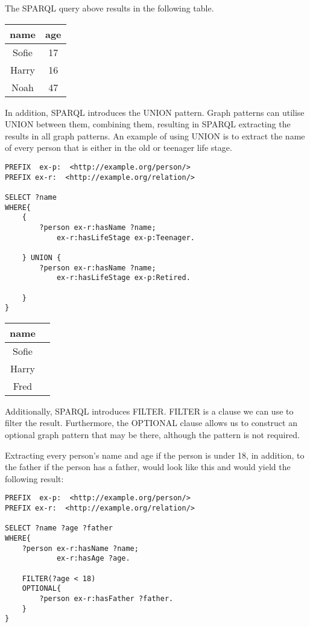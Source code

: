 \para
The SPARQL query above results in the following table. 

\para
\begin{tabular}{@{}cc@{}}
    \toprule
    name & age  \\ \midrule
    Sofie & 17 \\ 
    Harry & 16 \\ 
    Noah  & 47 \\ \bottomrule
\end{tabular}

\para 
In addition, SPARQL introduces the UNION pattern. Graph patterns can utilise UNION between them, combining them, resulting in SPARQL extracting the results in all graph patterns. An example of using UNION is to extract the name of every person that is either in the old or teenager life stage.

\para
\begin{lstlisting}[frame=single, language=turtle, frame=none]
PREFIX  ex-p:  <http://example.org/person/> 
PREFIX ex-r:  <http://example.org/relation/> 

SELECT ?name
WHERE{
    {
        ?person ex-r:hasName ?name;
            ex-r:hasLifeStage ex-p:Teenager.

    } UNION {
        ?person ex-r:hasName ?name;
            ex-r:hasLifeStage ex-p:Retired.

    }
}
\end{lstlisting}

\para
\begin{tabular}{@{}cc@{}}
    \toprule
    name & \\ \midrule
    Sofie \\ 
    Harry \\ 
    Fred  \\ \bottomrule
\end{tabular}


\para
Additionally, SPARQL introduces FILTER. FILTER is a clause we can use to filter the result. Furthermore, the OPTIONAL clause allows us to construct an optional graph pattern that may be there, although the pattern is not required.

\para
Extracting every person's name and age if the person is under 18, in addition, to the father if the person has a father, would look like this and would yield   the following result:

\para
\begin{lstlisting}[frame=single, language=turtle, frame=none]
PREFIX  ex-p:  <http://example.org/person/> 
PREFIX ex-r:  <http://example.org/relation/> 

SELECT ?name ?age ?father
WHERE{
    ?person ex-r:hasName ?name;
            ex-r:hasAge ?age.

    FILTER(?age < 18)
    OPTIONAL{
        ?person ex-r:hasFather ?father.
    }
}
\end{lstlisting}

